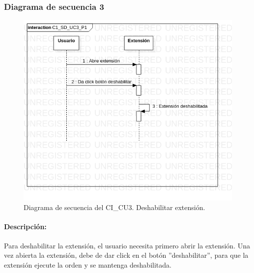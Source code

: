 \documentclass[12pt, a4paper, titlepage]{report}
\begin{document}
    			\subsubsection{Diagrama de secuencia 3}
    			    \begin{figure}[H]
    				    \begin{center} \includegraphics[width=15cm]{./imagenes/Disenio/Componente_1/C1_SD_UC3_P1.png}
    				    \caption[Diagrama de secuencia 3 del Componente I]{Diagrama de secuencia del CI\_CU3. Deshabilitar extensión.}
    			        \end{center}
    			    \end{figure}
    			    
    			    \paragraph{Descripción:}
    			    Para deshabilitar la extensión, el usuario necesita primero abrir la extensión. Una vez abierta la extensión, debe de dar click en el botón ''deshabilitar'', para que la extensión ejecute la orden y se mantenga deshabilitada.
    			   
    			
\end{document}
